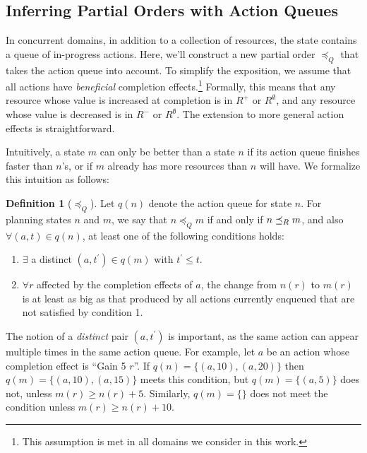 \documentclass[letterpaper]{article}
\theoremstyle{plain} \newtheorem{theorem}{Theorem} \newtheorem{proposition}{Proposition} \newtheorem{lemma}{Lemma}
\theoremstyle{definition} \newtheorem{definition}{Definition} \newtheorem{conjecture}{Conjecture} \newtheorem*{example}{Example}
\theoremstyle{remark} \newtheorem*{remark}{Remark} \newtheorem*{note}{Note} \newtheorem{case}{Case}
\begin{document}
\subsection{Inferring Partial Orders with Action Queues}

\newcommand{\poq}{\preceq_Q}

In concurrent domains, in addition to a collection of resources, the state contains a queue
of in-progress actions. Here, we'll construct a new partial order $\poq$ that takes the
action queue into account. To simplify the exposition, we assume that all
actions have \emph{beneficial} completion effects.\footnote{This assumption is met in all
domains we consider in this work.} Formally, this means that any resource whose value is
increased at completion is in $R^+$ or $R^\emptyset$, and any resource whose value is decreased is in
$R^-$ or $R^\emptyset$. The extension to more general action effects is straightforward.

Intuitively, a state $m$ can only be better than a state $n$ if
its action queue finishes faster than $n$'s, or if $m$ already
has more resources than $n$ will have. We formalize this
intuition as follows:

\begin{definition}[$\poq$]
	\label{def-poq}
	Let $q(n)$ denote the action queue for state $n$. For
  planning states $n$ and $m$, we say that $n \poq m$ if and
  only if $n \preceq_R m$, and also $\forall (a, t) \in q(n)$, at least one of the following conditions holds:
	\begin{enumerate}
		\item $\exists$ a distinct $ (a, t^\prime) \in q(m)$ with $t^\prime \le t$.
		\item $\forall r $ affected by the completion effects of $
      a$, the change from $n(r)$ to $m(r)$ is at least as big
      as that produced by all actions currently enqueued that
      are not satisfied by condition 1.
	\end{enumerate}
\end{definition}
The notion of a \emph{distinct} pair $(a, t^\prime)$ is important, as the same action can appear multiple times in the same action queue. For example, let $a$ be an action whose completion effect is ``Gain 5 $r$''. If $q(n) = \{(a, 10), (a, 20)\}$ then $q(m) = \{(a, 10),
(a, 15)\}$ meets this condition, but $q(m) = \{(a, 5)\}$ does not, unless $m(r) \ge n(r) + 5$. Similarly, $q(m) = \{\}$ does not meet the condition unless $m(r) \ge n(r) + 10$.
\end{document}
